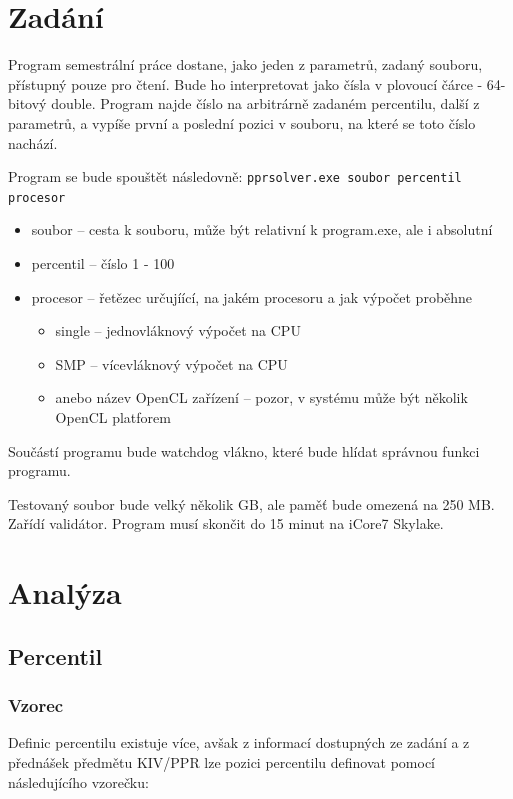\documentclass[12pt, a4paper]{article}
\let\oldsection\section
\renewcommand\section{\clearpage\oldsection}
\begin{document}
\section{Zadání}

Program semestrální práce dostane, jako jeden z parametrů, zadaný souboru, přístupný pouze pro čtení. Bude ho interpretovat jako čísla v plovoucí čárce - 64-bitový double. Program najde číslo na arbitrárně zadaném percentilu, další z parametrů, a vypíše první a poslední pozici v souboru, na které se toto číslo nachází.

Program se bude spouštět následovně: \texttt{pprsolver.exe soubor percentil procesor}

\begin{itemize}
    \item soubor -- cesta k souboru, může být relativní k program.exe, ale i absolutní
    \item percentil -- číslo 1 - 100
    \item procesor -- řetězec určujíící, na jakém procesoru a jak výpočet proběhne
    \begin{itemize}
        \item single -- jednovláknový výpočet na CPU
        \item SMP -- vícevláknový výpočet na CPU
        \item anebo název OpenCL zařízení -- pozor, v systému může být několik OpenCL platforem
    \end{itemize}
\end{itemize}

Součástí programu bude watchdog vlákno, které bude hlídat správnou funkci programu.

Testovaný soubor bude velký několik GB, ale paměť bude omezená na 250 MB. Zařídí validátor. Program musí skončit do 15 minut na iCore7 Skylake.

\section{Analýza}

\subsection{Percentil}

\subsubsection{Vzorec}
Definic percentilu existuje více, avšak z informací dostupných ze zadání a z přednášek předmětu KIV/PPR lze pozici percentilu definovat pomocí následujícího vzorečku:
\end{document}

